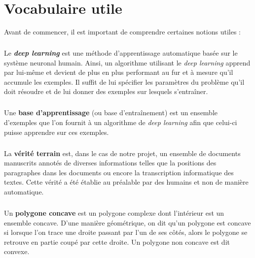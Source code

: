 \chapter{Vocabulaire utile}

Avant de commencer, il est important de comprendre certaines notions utiles :

\paragraph{}
Le \textbf{\textit{deep learning}} est une méthode d’apprentissage automatique
basée sur le système neuronal humain. Ainsi, un algorithme utilisant le \textit{deep learning}
apprend par lui-même et devient de plus en plus performant au fur et à mesure qu’il accumule
les exemples. Il suffit de lui spécifier les paramètres du problème qu’il doit résoudre et de
lui donner des exemples sur lesquels s’entraîner.

\paragraph{}
Une \textbf{base d’apprentissage} (ou base d'entraînement) est un ensemble d’exemples
que l’on fournit à un algorithme de \textit{deep learning} afin que celui-ci puisse apprendre
sur ces exemples.

\paragraph{}
La \textbf{vérité terrain} est, dans le cas de notre projet, un ensemble de documents manuscrits
annotés de diverses informations telles que la positions des paragraphes dans les documents ou encore la
transcription informatique des textes. Cette vérité a été établie au préalable par des humains et non
de manière automatique.

\paragraph{}
Un \textbf{polygone concave} est un polygone complexe dont l’intérieur est un ensemble concave.
D'une manière géométrique, on dit qu'un polygone est concave si lorsque l'on trace une droite passant
par l’un de ses côtés, alors le polygone se retrouve en partie coupé par cette droite.
Un polygone non concave est dit convexe.

